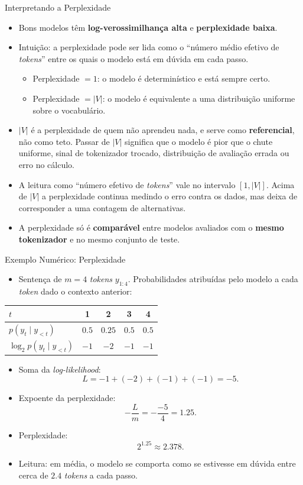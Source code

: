 \documentclass[aspectratio=169,xcolor=dvipsnames]{beamer}
\begin{document}
\begin{frame}{Interpretando a Perplexidade}
\begin{itemize}
    \item Bons modelos têm \textbf{log-verossimilhança alta} e \textbf{perplexidade baixa}.
    \item Intuição: a perplexidade pode ser lida como o ``número médio efetivo de \textit{tokens}'' entre os quais o modelo está em dúvida em cada passo.
    \begin{itemize}
        \item Perplexidade $= 1$: o modelo é determinístico e está sempre certo.
        \item Perplexidade $= |V|$: o modelo é equivalente a uma distribuição uniforme sobre o vocabulário.
    \end{itemize}
    \item $|V|$ é a perplexidade de quem não aprendeu nada, e serve como \textbf{referencial}, não como teto. Passar de $|V|$ significa que o modelo é pior que o chute uniforme, sinal de tokenizador trocado, distribuição de avaliação errada ou erro no cálculo.
    \item A leitura como ``número efetivo de \textit{tokens}'' vale no intervalo $[1, |V|]$. Acima de $|V|$ a perplexidade continua medindo o erro contra os dados, mas deixa de corresponder a uma contagem de alternativas.
    \item A perplexidade só é \textbf{comparável} entre modelos avaliados com o \textbf{mesmo tokenizador} e no mesmo conjunto de teste.
\end{itemize}
\end{frame}

\begin{frame}{Exemplo Numérico: Perplexidade}
\begin{itemize}\small
    \item Sentença de $m = 4$ \textit{tokens} $y_{1:4}$. Probabilidades atribuídas pelo modelo a cada \textit{token} dado o contexto anterior:
\end{itemize}
\centering
\begin{tabular}{l c c c c}
    \toprule
    $t$                            & 1   & 2    & 3   & 4   \\
    \midrule
    $p(y_t \mid y_{<t})$           & $0.5$ & $0.25$ & $0.5$ & $0.5$ \\
    $\log_2 p(y_t \mid y_{<t})$    & $-1$    & $-2$     & $-1$    & $-1$    \\
    \bottomrule
\end{tabular}
\begin{itemize}\small
    \item Soma da \textit{log-likelihood}:
    \[
        L = -1 + (-2) + (-1) + (-1) = -5.
    \]
    \item Expoente da perplexidade:
    \[
        -\frac{L}{m} = -\frac{-5}{4} = 1.25.
    \]
    \item Perplexidade:
    \[
        2^{1.25} \approx 2.378.
    \]
    \item Leitura: em média, o modelo se comporta como se estivesse em dúvida entre cerca de $2.4$ \textit{tokens} a cada passo.
\end{itemize}
\end{frame}
\end{document}
